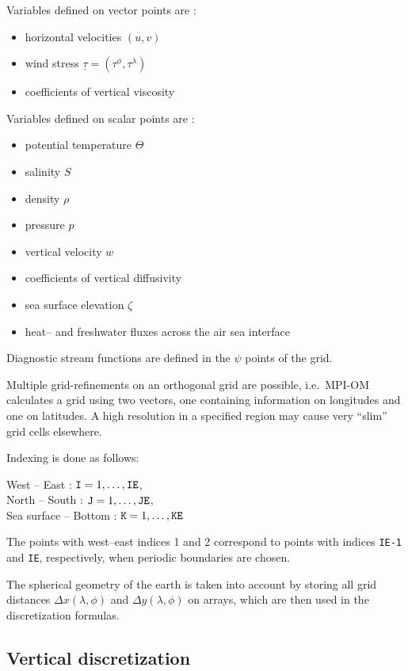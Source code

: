 Variables defined on vector points are :
\begin{itemize}
\item{horizontal velocities $(u,v)$} 
\item{wind stress $\underline\tau=(\tau^\phi ,\tau^\lambda)$}  
\item{coefficients of vertical viscosity} 
\end{itemize}
Variables defined on scalar points are :
\begin{itemize}
\item{potential temperature $\Theta$} 
\item{salinity $S$} 
\item{density $\rho$} 
\item{pressure $p$} 
\item{vertical velocity $w$}  
\item{coefficients of vertical diffusivity} 
\item{sea surface elevation $\zeta$} 
\item{heat-- and freshwater fluxes across the air sea interface} 
\end{itemize}
Diagnostic stream functions are defined in the $\psi$ points of the grid.

Multiple grid-refinements on an orthogonal grid are possible, i.e.\ MPI-OM calculates a grid using
two vectors, one containing information on longitudes
and one on latitudes. A high resolution in a specified region may cause very ``slim'' grid cells
elsewhere. 

Indexing is done as follows:

West -- East : $\mbox{\tt I} = 1,\ldots,\mbox{\tt IE}$,\\
North -- South : $\mbox{\tt J} = 1,\ldots,\mbox{\tt JE}$,\\
Sea surface -- Bottom : $\mbox{\tt K} = 1,\ldots,\mbox{\tt KE}$

The points with west--east indices 1 and 2
correspond to points with indices {\tt IE-1} and {\tt IE}, respectively,
when periodic boundaries are chosen.


The spherical geometry of the earth is taken into
account by storing all grid distances
$\Delta x(\lambda,\phi)$ and $ \Delta y(\lambda,\phi)$ on arrays, which are then used in the discretization
formulas.

\subsection{Vertical discretization}
\label{ver}

